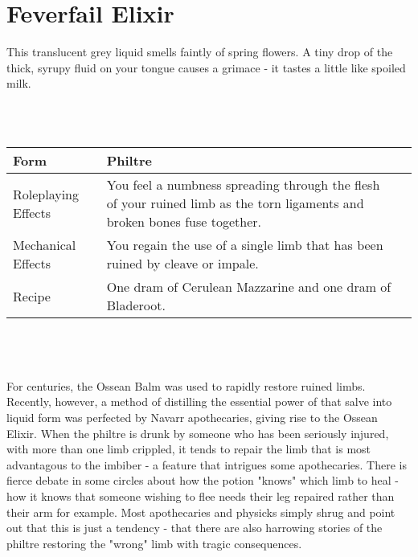\documentclass[a5paper,pagesize,10pt,bibtotoc,pointlessnumbers,
normalheadings,DIV=9,twoside=false]{scrbook}
\newcommand\potion[7]{
    \section{#1}
    #2
    \\\\
    \begin{tabular}{| p{.2\linewidth} | p{.72\textwidth} |}
        \hline
        Form & #3 \\
        \hline
        Roleplaying Effects & #4 \\
        \hline
        Mechanical Effects & #5 \\
        \hline
        Recipe & #6 \\
        \hline
    \end{tabular}
    \\\\\\
    #7
    \newpage
}
\begin{document}
\potion{Feverfail Elixir}{
    This translucent grey liquid smells faintly of spring flowers. A tiny drop of the thick, syrupy fluid on your tongue causes a grimace - it tastes a little like spoiled milk.
}{Philtre}{
    You feel nauseous. A dizzying chill spreads through your body, leaving you incapacitated for a few moments. Both effects clear as quickly as they arose, leaving you feeling revitalised.
}{
    You lose the weakness condition.
}{
    One dram of Bladeroot and one dram of Imperial Roseweald.
}{
    This elixir drives out the lingering effects of enervation. It is occasionally useful in treating symptoms that include excessive tiredness or dizziness.
}

\potion{Ossean Solution}{
    This thick, odourless, blue liquid has a gritty texture. When you rub it between finger and thumb it leaves a crusty residue that soon flakes away. It tastes disgusting.
}{Philtre}{
    You feel a numbness spreading through the flesh of your ruined limb as the torn ligaments and broken bones fuse together.
}{
    You regain the use of a single limb that has been ruined by cleave or impale.
}{
    One dram of Cerulean Mazzarine and one dram of Bladeroot.
}{
    For centuries, the Ossean Balm was used to rapidly restore ruined limbs. Recently, however, a method of distilling the essential power of that salve into liquid form was perfected by Navarr apothecaries, giving rise to the Ossean Elixir. When the philtre is drunk by someone who has been seriously injured, with more than one limb crippled, it tends to repair the limb that is most advantagous to the imbiber - a feature that intrigues some apothecaries. There is fierce debate in some circles about how the potion "knows" which limb to heal - how it knows that someone wishing to flee needs their leg repaired rather than their arm for example. Most apothecaries and physicks simply shrug and point out that this is just a tendency - that there are also harrowing stories of the philtre restoring the "wrong" limb with tragic consequences.
}
\end{document}
